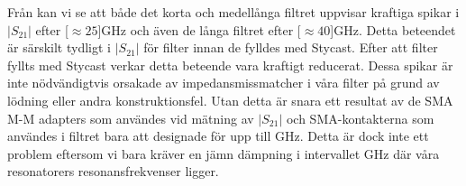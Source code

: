 \documentclass[main.tex]{subfiles}
\begin{document}
Från  kan vi se att både det korta och medellånga filtret uppvisar kraftiga spikar i $|S_{21}|$ efter \unit[$\approx 25$]{GHz} och även de långa filtret efter \unit[$\approx 40$]{GHz}. Detta beteendet är särskilt tydligt i $|S_{21}|$ för filter innan de fylldes med Stycast. Efter att filter fyllts med Stycast verkar detta beteende vara kraftigt reducerat. Dessa spikar är inte nödvändigtvis orsakade av impedansmissmatcher i våra filter på grund av lödning eller andra konstruktionsfel. Utan detta är snara ett resultat av de SMA M-M adapters som användes vid mätning av $|S_{21}|$ och SMA-kontakterna som användes i filtret bara att designade för upp till \unit[18]{GHz}. Detta är dock inte ett problem eftersom vi bara kräver en jämn dämpning i intervallet \unit[4-8]{GHz} där våra resonatorers resonansfrekvenser ligger.
\end{document}
